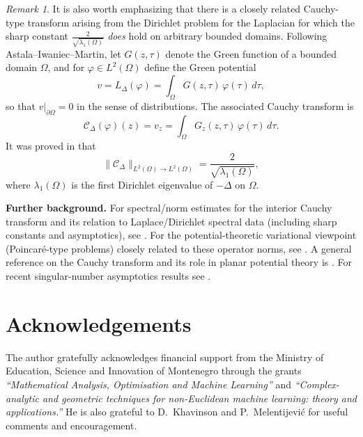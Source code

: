 \documentclass{amsart}
\theoremstyle{plain}
\theoremstyle{remark}
\newtheorem{remark}[theorem]{Remark}
\begin{document}
\begin{remark}
It is also worth emphasizing that there is a closely related Cauchy-type transform arising from the
Dirichlet problem for the Laplacian for which the sharp constant \(\frac{2}{\sqrt{\lambda_1(\Omega)}}\)
\emph{does} hold on arbitrary bounded domains. Following Astala--Iwaniec--Martin, let \(G(z,\tau)\) denote
the Green function of a bounded domain \(\Omega\), and for \(\varphi\in L^2(\Omega)\) define the Green
potential
\begin{equation}\label{eq:green-potential}
v=L_\Delta(\varphi)=\int_\Omega G(z,\tau)\,\varphi(\tau)\,d\tau,
\end{equation}
so that \(v|_{\partial\Omega}=0\) in the sense of distributions. The associated Cauchy transform is
\begin{equation}\label{eq:assoc-cauchy}
\mathcal{C}_\Delta(\varphi)(z)=v_z=\int_\Omega G_z(z,\tau)\,\varphi(\tau)\,d\tau .
\end{equation}
It was proved in \cite{Kalaj2012IEOT} that
\begin{equation}\label{eq:kalaj-norm}
\|\mathcal{C}_\Delta\|_{L^2(\Omega)\to L^2(\Omega)}=\frac{2}{\sqrt{\lambda_1(\Omega)}},
\end{equation}
where \(\lambda_1(\Omega)\) is the first Dirichlet eigenvalue of \(-\Delta\) on \(\Omega\).
\end{remark}

\noindent\textbf{Further background.}
For spectral/norm estimates for the interior Cauchy transform and its relation to Laplace/Dirichlet
spectral data (including sharp constants and asymptotics), see
\cite{ArazyKhavinson1992,Dostanic1998,Dostanic2005IEOT,Dostanic2007JFA,Liu2016,Khavinson2018Conm720}.
For the potential-theoretic variational viewpoint (Poincar\'e-type problems) closely related to
these operator norms, see \cite{KhavinsonPutinarShapiro2007}.
A general reference on the Cauchy transform and its role in planar potential theory is \cite{Bell2015}.
For recent singular-number asymptotics results see \cite{Vujadinovic2025} .
\section*{Acknowledgements}
The  author gratefully acknowledges financial support from the Ministry of Education, Science and Innovation of Montenegro through the grants \emph{``Mathematical Analysis, Optimisation and Machine Learning''} and \emph{``Complex-analytic and geometric techniques for non-Euclidean machine learning: theory and applications.''} He is also grateful to D.~Khavinson and P.~Melentijevi\'c for useful comments and encouragement.
\end{document}
